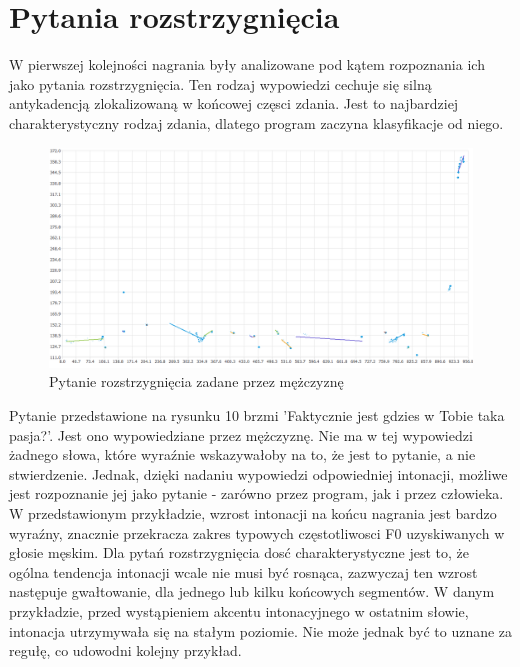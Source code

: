 \documentclass[a4paper,12 pt]{report}
\begin{document}
\section{Pytania rozstrzygnięcia}
W pierwszej kolejności nagrania były analizowane pod kątem rozpoznania ich jako pytania rozstrzygnięcia. Ten rodzaj wypowiedzi cechuje się silną antykadencją zlokalizowaną w końcowej częsci zdania.
Jest to najbardziej charakterystyczny rodzaj zdania, dlatego program zaczyna klasyfikacje od niego.
 \FloatBarrier
\begin{figure}[h]
\centering
\includegraphics[scale=0.6]{pytanie_rozstrzygniecia.png}
\caption{Pytanie rozstrzygnięcia zadane przez mężczyznę}
\end{figure}
\FloatBarrier
Pytanie przedstawione na rysunku 10 brzmi 'Faktycznie jest gdzies w Tobie taka pasja?'. Jest ono wypowiedziane przez mężczyznę. Nie ma w tej wypowiedzi żadnego słowa, które wyraźnie wskazywałoby na to, że jest to pytanie, a nie stwierdzenie. Jednak, dzięki nadaniu wypowiedzi odpowiedniej intonacji, możliwe jest rozpoznanie jej jako pytanie - zarówno przez program, jak i przez człowieka. W przedstawionym przykładzie, wzrost intonacji na końcu nagrania jest bardzo wyraźny, znacznie przekracza zakres typowych częstotliwosci F0 uzyskiwanych w głosie męskim. Dla pytań rozstrzygnięcia dosć charakterystyczne jest to, że ogólna tendencja intonacji wcale nie musi być rosnąca, zazwyczaj ten wzrost następuje gwałtowanie, dla jednego lub kilku końcowych segmentów. W danym przykładzie, przed wystąpieniem akcentu intonacyjnego w ostatnim słowie, intonacja utrzymywała się na stałym poziomie. Nie może jednak być to uznane za regułę, co udowodni kolejny przykład.
 \FloatBarrier
\end{document}
